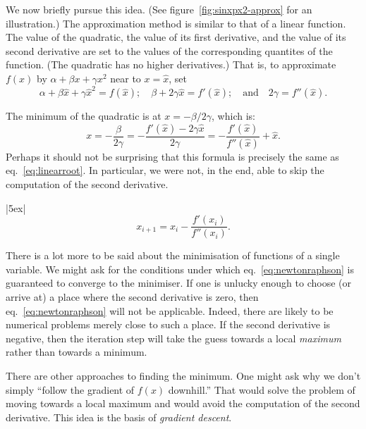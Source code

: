 \documentclass[10pt, a4paper]{article}
\begin{document}
We now briefly pursue this idea. (See figure~\ref{fig:sinxpx2-approx}
for an illustration.) The approximation method is similar to that of a
linear function. The value of the quadratic, the value of its first
derivative, and the value of its second derivative are set to the
values of the corresponding quantites of the function. (The quadratic
has no higher derivatives.) That is, to approximate $f(x)$ by
$\alpha+\beta x+\gamma x^2$ near to $x=\hat{x}$, set
\begin{equation*}
  \alpha +\beta\hat{x} + \gamma\hat{x}^2 = f(\hat{x});\quad
  \beta +2\gamma\hat{x} = f'(\hat{x});\quad\text{and}\quad
  2\gamma = f''(\hat{x}).
\end{equation*}

The minimum of the quadratic is at $x=-\beta/2\gamma$, which is:
\begin{equation*}
  x = -\frac{\beta}{2\gamma}
  = -\frac{f'(\hat{x})-2\gamma\hat{x}}{2\gamma}
  = -\frac{f'(\hat{x})}{f''(\hat{x})} +\hat{x}. 
\end{equation*}
Perhaps it should not be surprising that this formula is precisely the
same as eq.~\eqref{eq:linearroot}. In particular, we were not, in the
end, able to skip the computation of the second derivative.

\begin{marginfigure}|5ex|
  \begin{equation*}
    x_{i+1} = x_i - \frac{f'(x_i)}{f''(x_i)}.
  \end{equation*}
\end{marginfigure}
There is a lot more to be said about the minimisation of functions of
a single variable. We might ask for the conditions under which
eq.~\eqref{eq:newtonraphson} is guaranteed to converge to the
minimiser. If one is unlucky enough to choose (or arrive at) a place
where the second derivative is zero, then eq.~\eqref{eq:newtonraphson}
will not be applicable. Indeed, there are likely to be numerical
problems merely close to such a place. If the second derivative is
negative, then the iteration step will take the guess towards a local
\emph{maximum} rather than towards a minimum.

There are other approaches to finding the minimum. One might ask why
we don't simply ``follow the gradient of $f(x)$ downhill.'' That would
solve the problem of moving towards a local maximum and would avoid
the computation of the second derivative. This idea is the basis of
\emph{gradient descent}.
\end{document}

